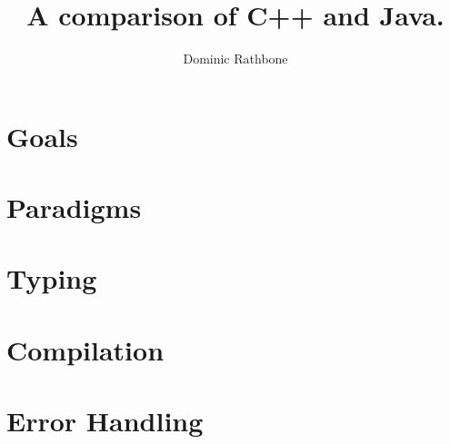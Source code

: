 \documentclass[]{report}
\title{A comparison of C++ and Java.}
\author{Dominic Rathbone}
\begin{document}
\maketitle
\section{Goals}
\section{Paradigms}
\section{Typing}
\section{Compilation}
\section{Error Handling}
\end{document}
